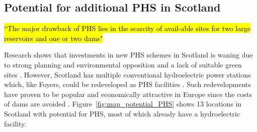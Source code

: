 \begin{comment}
``As a pumped storage system it generates 300Mw from two 150Mw machines. During the day the machines are kept on spinning reserve ready to meet periods of peak demand, the response time is in the order of 15 seconds. Spinning reserve requires the machines to rotate in synchronisation with the National Grid frequency. Power to keep the machines in this state of readiness, is drawn from the 5Mw adjacent hydro station.

``The cost of the power absorbed in maintaining spinning reserve is paid for by the utility requiring peak load electricity, this spinning reserve power is charged at a premium rate above normal grid prices. Peak load electricity can command prices in the thousands of pounds per Mw/hr all be it for short bursts of power at any given time. On average a pumped storage scheme may well have in excess of ten thousand stop -starts in a year.

``[\ldots]The investment in Foyers described above suggests that it may be both feasible and profitable to upgrade and refurbish other existing hydro schemes."
\url{http://www.esru.strath.ac.uk/EandE/Web_sites/03-04/wind/content/storage%20available.html}
\end{comment}




\subsection{Potential for additional PHS in Scotland}

\hl{``The major drawback of PHS lies in the scarcity of avail-able sites for two large reservoirs and one or two dams"} \citep{Chen2009}

Research shows that investments in new PHS schemes in Scotland is waning due to strong planning and environmental opposition and a lack of suitable green sites \citep{Strathclyde2004, ScotsRenewables2011, Chen2009}.
However, Scotland has multiple conventional hydroelectric power stations which, like Foyers, could be redeveloped as PHS facilities \citep{Strathclyde2004, MacKayDavid2009}.
Such redevelopments have proven to be popular and economically attractive in Europe since the costs of dams are avoided \citep{ESMStudy2010}.
Figure~\ref{fig:map_potential_PHS} shows 13 locations in Scotland with potential for PHS, most of which already have a hydroelectric facility.



